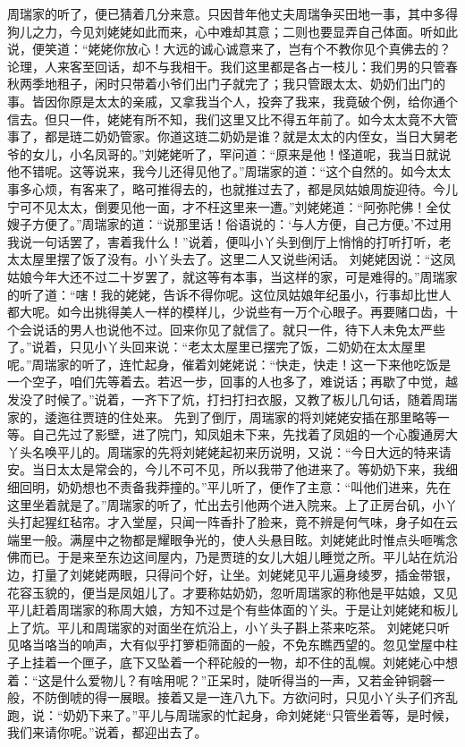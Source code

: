 \documentclass[12pt,oneside]{book}
\begin{document}
周瑞家的听了，便已猜着几分来意。只因昔年他丈夫周瑞争买田地一事，其中多得狗儿之力，今见刘姥姥如此而来，心中难却其意；二则也要显弄自己体面。听如此说，便笑道：“姥姥你放心！大远的诚心诚意来了，岂有个不教你见个真佛去的？论理，人来客至回话，却不与我相干。我们这里都是各占一枝儿：我们男的只管春秋两季地租子，闲时只带着小爷们出门子就完了；我只管跟太太、奶奶们出门的事。皆因你原是太太的亲戚，又拿我当个人，投奔了我来，我竟破个例，给你通个信去。但只一件，姥姥有所不知，我们这里又比不得五年前了。如今太太竟不大管事了，都是琏二奶奶管家。你道这琏二奶奶是谁？就是太太的内侄女，当日大舅老爷的女儿，小名凤哥的。”刘姥姥听了，罕问道：“原来是他！怪道呢，我当日就说他不错呢。这等说来，我今儿还得见他了。”周瑞家的道：“这个自然的。如今太太事多心烦，有客来了，略可推得去的，也就推过去了，都是凤姑娘周旋迎待。今儿宁可不见太太，倒要见他一面，才不枉这里来一遭。”刘姥姥道：“阿弥陀佛！全仗嫂子方便了。”周瑞家的道：“说那里话！俗语说的：‘与人方便，自己方便。’不过用我说一句话罢了，害着我什么！”说着，便叫小丫头到倒厅上悄悄的打听打听，老太太屋里摆了饭了没有。小丫头去了。这里二人又说些闲话。
刘姥姥因说：“这凤姑娘今年大还不过二十岁罢了，就这等有本事，当这样的家，可是难得的。”周瑞家的听了道：“嗐！我的姥姥，告诉不得你呢。这位凤姑娘年纪虽小，行事却比世人都大呢。如今出挑得美人一样的模样儿，少说些有一万个心眼子。再要赌口齿，十个会说话的男人也说他不过。回来你见了就信了。就只一件，待下人未免太严些了。”说着，只见小丫头回来说：“老太太屋里已摆完了饭，二奶奶在太太屋里呢。”周瑞家的听了，连忙起身，催着刘姥姥说：“快走，快走！这一下来他吃饭是一个空子，咱们先等着去。若迟一步，回事的人也多了，难说话；再歇了中觉，越发没了时候了。”说着，一齐下了炕，打扫打扫衣服，又教了板儿几句话，随着周瑞家的，逶迤往贾琏的住处来。
先到了倒厅，周瑞家的将刘姥姥安插在那里略等一等。自己先过了影壁，进了院门，知凤姐未下来，先找着了凤姐的一个心腹通房大丫头名唤平儿的。周瑞家的先将刘姥姥起初来历说明，又说：“今日大远的特来请安。当日太太是常会的，今儿不可不见，所以我带了他进来了。等奶奶下来，我细细回明，奶奶想也不责备我莽撞的。”平儿听了，便作了主意：“叫他们进来，先在这里坐着就是了。”周瑞家的听了，忙出去引他两个进入院来。上了正房台矶，小丫头打起猩红毡帘。才入堂屋，只闻一阵香扑了脸来，竟不辨是何气味，身子如在云端里一般。满屋中之物都是耀眼争光的，使人头悬目眩。刘姥姥此时惟点头咂嘴念佛而已。于是来至东边这间屋内，乃是贾琏的女儿大姐儿睡觉之所。平儿站在炕沿边，打量了刘姥姥两眼，只得问个好，让坐。刘姥姥见平儿遍身绫罗，插金带银，花容玉貌的，便当是凤姐儿了。才要称姑奶奶，忽听周瑞家的称他是平姑娘，又见平儿赶着周瑞家的称周大娘，方知不过是个有些体面的丫头。于是让刘姥姥和板儿上了炕。平儿和周瑞家的对面坐在炕沿上，小丫头子斟上茶来吃茶。
刘姥姥只听见咯当咯当的响声，大有似乎打箩柜筛面的一般，不免东瞧西望的。忽见堂屋中柱子上挂着一个匣子，底下又坠着一个秤砣般的一物，却不住的乱幌。刘姥姥心中想着：“这是什么爱物儿？有啥用呢？”正呆时，陡听得当的一声，又若金钟铜磬一般，不防倒唬的得一展眼。接着又是一连八九下。方欲问时，只见小丫头子们齐乱跑，说：“奶奶下来了。”平儿与周瑞家的忙起身，命刘姥姥“只管坐着等，是时候，我们来请你呢。”说着，都迎出去了。
\end{document}

